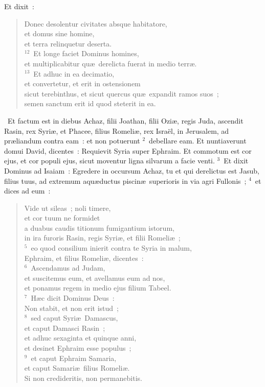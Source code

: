  Et dixit~: \begin{flushleft}\begin{verse}Donec desolentur civitates absque habitatore,\\ et domus sine homine,\\ et terra relinquetur deserta.\\
${}^{12}$~Et longe faciet Dominus homines,\\ et multiplicabitur qu\ae\ derelicta fuerat in medio terr\ae .\\
${}^{13}$~Et adhuc in ea decimatio,\\ et convertetur, et erit in ostensionem\\ sicut terebinthus, et sicut quercus qu\ae\ expandit ramos suos~;\\ semen sanctum erit id quod steterit in ea.\end{verse}\end{flushleft}


~Et factum est in diebus Achaz, filii Joathan, filii Ozi\ae , regis Juda, ascendit Rasin, rex Syri\ae , et Phacee, filius Romeli\ae , rex Isra\"el, in Jerusalem, ad pr\ae liandum contra eam~: et non potuerunt
${}^{2}$~debellare eam. Et nuntiaverunt domui David, dicentes~: Requievit Syria super Ephraim. Et commotum est cor ejus, et cor populi ejus, sicut moventur ligna silvarum a facie venti.
${}^{3}$~Et dixit Dominus ad Isaiam~: Egredere in occursum Achaz, tu et qui derelictus est Jasub, filius tuus, ad extremum aqu\ae ductus piscin\ae\ superioris in via agri Fullonis~;
${}^{4}$~et dices ad eum~: \begin{flushleft}\begin{verse}Vide ut sileas~; noli timere,\\ et cor tuum ne formidet\\ a duabus caudis titionum fumigantium istorum,\\ in ira furoris Rasin, regis Syri\ae , et filii Romeli\ae~;\\
${}^{5}$~eo quod consilium inierit contra te Syria in malum,\\ Ephraim, et filius Romeli\ae , dicentes~:\\
${}^{6}$~Ascendamus ad Judam,\\ et suscitemus eum, et avellamus eum ad nos,\\ et ponamus regem in medio ejus filium Tabeel.\\
${}^{7}$~H\ae c dicit Dominus Deus~:\\ Non stabit, et non erit istud~;\\
${}^{8}$~sed caput Syri\ae\ Damascus,\\ et caput Damasci Rasin~;\\ et adhuc sexaginta et quinque anni,\\ et desinet Ephraim esse populus~;\\
${}^{9}$~et caput Ephraim Samaria,\\ et caput Samari\ae\ filius Romeli\ae .\\ Si non credideritis, non permanebitis.\end{verse}\end{flushleft}


